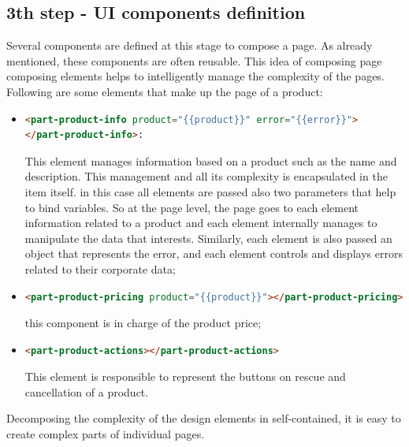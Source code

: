 \subsection{3th step - UI components definition}
Several components are defined at this stage to compose a page. As already mentioned, these components are often reusable.
\newline
This idea of composing page composing elements helps to intelligently manage the complexity of the pages. Following are some elements that make up the page of a product:
\begin{itemize}
\item
\begin{lstlisting}[language=html]
<part-product-info product="{{product}}" error="{{error}}">
</part-product-info>:
\end{lstlisting}
This element manages information based on a product such as the name and description. This management and all its complexity is encapsulated in the item itself. in this case all elements are passed also two parameters that help to bind variables. So at the page level, the page goes to each element information related to a product and each element internally manages to manipulate the data that interests. Similarly, each element is also passed an object that represents the error, and each element controls and displays errors related to their corporate data;
\item
\begin{lstlisting}[language=html]
<part-product-pricing product="{{product}}"></part-product-pricing>
\end{lstlisting}
this component is in charge of the product price;
\item
\begin{lstlisting}[language=html]
<part-product-actions></part-product-actions>
\end{lstlisting}
This element is responsible to represent the buttons on rescue and cancellation of a product.
\end{itemize}
Decomposing the complexity of the design elements in self-contained, it is easy to create complex parts of individual pages.
